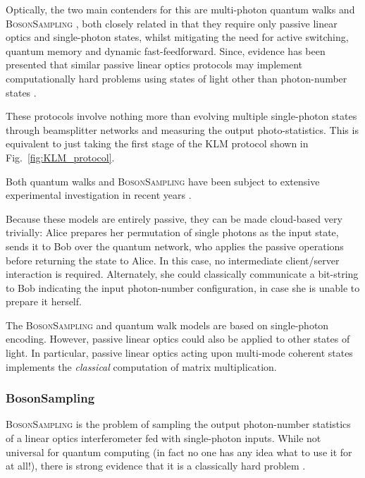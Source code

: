 \documentclass[aps, rmp, twocolumn, amsmath, amssymb, nofootinbib, superscriptaddress, longbibliography, floatfix, table-of-contents, eqsecnum]{revtex4-1}
\begin{document}
Optically, the two main contenders for this are multi-photon quantum walks \cite{bib:Aharonov93, bib:Aharonov01, bib:Kempe03, bib:Childs09, bib:Salvador12, bib:RohdeMultiWalk11} and \textsc{BosonSampling} \cite{bib:AaronsonArkhipov10, bib:RohdeIntroBS15}, both closely related in that they require only passive linear optics and single-photon states, whilst mitigating the need for active switching, quantum memory and dynamic fast-feedforward. Since, evidence has been presented that similar passive linear optics protocols may implement computationally hard problems using states of light other than photon-number states \cite{bib:RandBS, bib:RohdePhotAdd15, bib:RohdeDisp15, bib:RohdeCat15}.

These protocols involve nothing more than evolving multiple single-photon states through beamsplitter networks and measuring the output photo-statistics. This is equivalent to just taking the first stage of the KLM protocol shown in Fig.~\ref{fig:KLM_protocol}.

Both quantum walks and \textsc{BosonSampling} have been subject to extensive experimental investigation in recent years \cite{bib:PeruzzoQW, bib:Broome10, bib:Schreiber11b, bib:Owens11, bib:RohdeQWExp12, bib:Broome2012, bib:RohdeQWExp12, bib:Spring2, bib:Crespi3, bib:Tillmann4}.

Because these models are entirely passive, they can be made cloud-based very trivially: Alice prepares her permutation of single photons as the input state, sends it to Bob over the quantum network, who applies the passive operations before returning the state to Alice. In this case, no intermediate client/server interaction is required. Alternately, she could classically communicate a bit-string to Bob indicating the input photon-number configuration, in case she is unable to prepare it herself.

The \textsc{BosonSampling} and quantum walk models are based on single-photon encoding. However, passive linear optics could also be applied to other states of light. In particular, passive linear optics acting upon multi-mode coherent states implements the \textit{classical} computation of matrix multiplication.

%
%

\subsubsection{{\sc BosonSampling}} \label{sec:BS} 

\textsc{BosonSampling} is the problem of sampling the output photon-number statistics of a linear optics interferometer fed with single-photon inputs. While not universal for quantum computing (in fact no one has any idea what to use it for at all!), there is strong evidence that it is a classically hard problem \cite{bib:AaronsonArkhipov10, bib:RohdeIntroBS15}.
\end{document}
